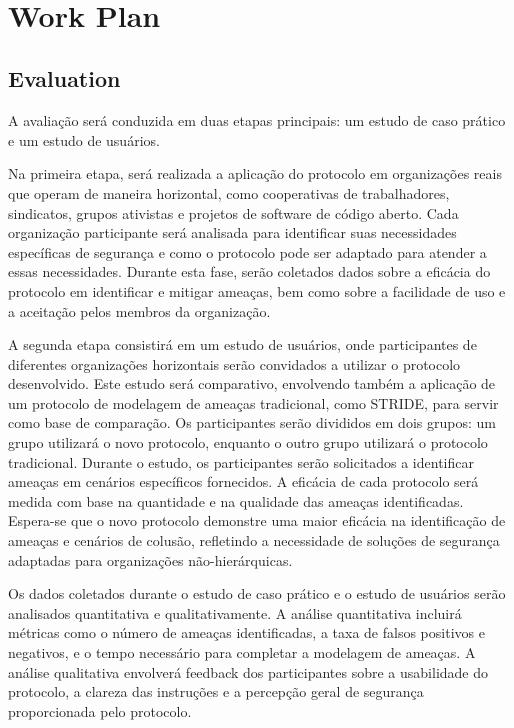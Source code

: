 
%
\   
\chapter{Work Plan}
\label{cha:work_plan}

\glsresetall

\section{Evaluation}
\label{sec:evaluation}

A avaliação será conduzida em duas etapas principais: um estudo de
caso prático e um estudo de usuários. 

Na primeira etapa, será realizada a aplicação do protocolo em organizações
reais que operam de maneira horizontal, como cooperativas de trabalhadores,
sindicatos, grupos ativistas e projetos de software de código aberto. Cada organização
participante será analisada para identificar suas necessidades específicas de segurança e
como o protocolo pode ser adaptado para atender a essas necessidades. Durante esta
fase, serão coletados dados sobre a eficácia do protocolo em identificar e mitigar
ameaças, bem como sobre a facilidade de uso e a aceitação pelos membros da organização.

A segunda etapa consistirá em um estudo de usuários, onde participantes de
diferentes organizações horizontais serão convidados a utilizar o protocolo desenvolvido.
Este estudo será comparativo, envolvendo também a aplicação de um protocolo de
modelagem de ameaças tradicional, como STRIDE, para servir como base de comparação. Os
participantes serão divididos em dois grupos: um grupo utilizará o novo protocolo, enquanto
o outro grupo utilizará o protocolo tradicional. Durante o estudo, os
participantes serão solicitados a identificar ameaças em cenários específicos fornecidos. A
eficácia de cada protocolo será medida com base na quantidade e na qualidade das
ameaças identificadas. Espera-se que o novo protocolo
demonstre uma maior eficácia na identificação de ameaças e cenários de colusão,
refletindo a necessidade de soluções de segurança adaptadas para organizações
não-hierárquicas. 

Os dados coletados durante o estudo de caso prático e o estudo de usuários
serão analisados quantitativa e qualitativamente. A análise quantitativa incluirá
métricas como o número de ameaças identificadas, a taxa de falsos positivos e
negativos, e o tempo necessário para completar a modelagem de ameaças. A análise
qualitativa envolverá feedback dos participantes sobre a usabilidade do protocolo, a
clareza das instruções e a percepção geral de segurança proporcionada pelo protocolo. 

